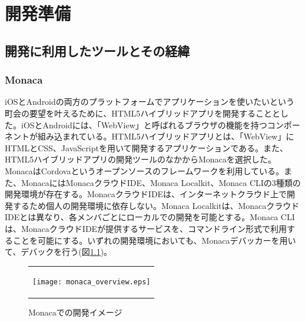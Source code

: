 \chapter{開発準備}

\section{開発に利用したツールとその経緯}%
\subsection{Monaca}%
iOSとAndroidの両方のプラットフォームでアプリケーションを使いたいという町会の要望を叶えるために、HTML5ハイブリッドアプリを開発することとした。iOSとAndroidには、「WebView」と呼ばれるブラウザの機能を持つコンポーネントが組み込まれている\cite{book_about_monaca}。HTML5ハイブリッドアプリとは、「WebView」にHTMLとCSS、JavaScriptを用いて開発するアプリケーションである\cite{book_about_monaca}。また、HTML5ハイブリッドアプリの開発ツールのなかからMonacaを選択した。MonacaはCordovaというオープンソースのフレームワークを利用している\cite{book_about_monaca}。また、MonacaにはMonacaクラウドIDE、Monaca Localkit、Monaca CLIの3種類の開発環境が存在する\cite{book_about_monaca}。MonacaクラウドIDEは、インターネットクラウド上で開発するため個人の開発環境に依存しない\cite{book_about_monaca}。Monaca Localkitは、MonacaクラウドIDEとは異なり、各メンバごとにローカルでの開発を可能とする\cite{book_about_monaca}。Monaca CLIは、MonacaクラウドIDEが提供するサービスを、コマンドライン形式で利用することを可能にする\cite{book_about_monaca}。いずれの開発環境においても、Monacaデバッカーを用いて、デバックを行う(図\ref{fig:image_monaca})。

\begin{figure}[h]
  \begin{center}
    \begin{tabular}{c}

      \begin{minipage}{0.7\hsize}
        \begin{center}
\texttt{[image: monaca\_overview.eps]}
          \hspace{1cm} %
        \end{center}
      \end{minipage}

    \end{tabular}
    \caption{Monacaでの開発イメージ\cite{monaca_debugger}}
    \label{fig:image_monaca}
  \end{center}
\end{figure}

